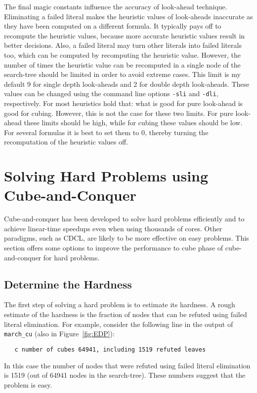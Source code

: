 \documentclass{llncs}
\begin{document}
The final magic constants influence the accuracy of look-ahead technique. Eliminating a failed literal makes the heuristic values
of look-aheads inaccurate as they have been computed on a different formula. It typically pays off to recompute the heuristic 
values, because more accurate heuristic values result in better decisions. Also, a failed literal may turn other literals into failed
literals too, which can be computed by recomputing the heuristic value. However, the number of times the 
heuristic value can be recomputed in a single node of the search-tree should be limited in order to avoid extreme cases.
This limit is my default 9 for single depth look-aheads  and 2 for double depth look-aheads. These values can be changed using
the command line options {\tt -sli} and {\tt -dli}, respectively. For most heuristics hold that: what is good for pure look-ahead is 
good for cubing. However, this is not the case for these two limits. For pure look-ahead these limits should be high, while for 
cubing these values should be low. For several formulas it is best to set them to 0, thereby turning the recomputation of 
the heuristic values off.

\section{Solving Hard Problems using Cube-and-Conquer}

Cube-and-conquer has been developed to solve hard problems efficiently and to achieve linear-time speedups even when using
thousands of cores. Other paradigms, such as CDCL, are likely to be more effective on easy problems. This section offers some 
options to improve the performance to cube phase of cube-and-conquer for hard problems. 

\subsection{Determine the Hardness}

The first step of solving a hard problem is to estimate its hardness. A rough estimate of the hardness is the fraction of nodes that can
be refuted using failed literal elimination. For example, consider the following line in
the output of {\tt march\_cu} (also in Figure~\ref{fig:EDP}):
%
\begin{verbatim}
   c number of cubes 64941, including 1519 refuted leaves
\end{verbatim}
%
In this case the number of nodes that were refuted using failed literal elimination is 1519 (out of 64941 nodes in the search-tree). 
These numbers suggest that the problem is easy. 
\end{document}
